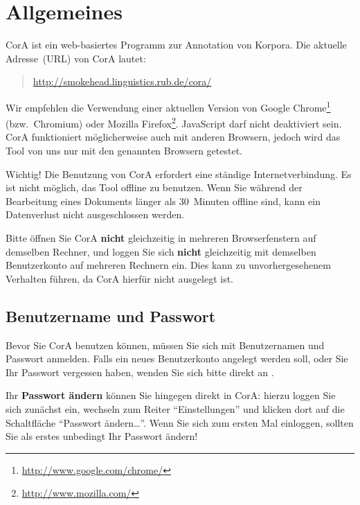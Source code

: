 \documentclass[11pt,a4paper,parskip=half]{scrartcl}
\begin{document}

\section{Allgemeines}

CorA ist ein web-basiertes Programm zur Annotation von Korpora.  Die
aktuelle Adresse~(URL) von CorA lautet:

\begin{quote}
  \url{http://smokehead.linguistics.rub.de/cora/}
\end{quote}

Wir empfehlen die Verwendung einer aktuellen Version von Google
Chrome\footnote{\url{http://www.google.com/chrome/}} (bzw.\ Chromium)
oder Mozilla Firefox\footnote{\url{http://www.mozilla.com/}}.
JavaScript darf nicht deaktiviert sein.  CorA funktioniert
möglicherweise auch mit anderen Browsern, jedoch wird das Tool von uns
nur mit den genannten Browsern getestet.

\begin{alertbox}{Wichtig!}
  Die Benutzung von CorA erfordert eine ständige Internetverbindung.
  Es ist nicht möglich, das Tool offline zu benutzen.  Wenn Sie
  während der Bearbeitung eines Dokuments länger als 30~Minuten
  offline sind, kann ein Datenverlust nicht ausgeschlossen werden.
\end{alertbox}

Bitte öffnen Sie CorA \textbf{nicht} gleichzeitig in mehreren
Browserfenstern auf demselben Rechner, und loggen Sie sich
\textbf{nicht} gleichzeitig mit demselben Benutzerkonto auf mehreren
Rechnern ein.  Dies kann zu unvorhergesehenem Verhalten führen, da
CorA hierfür nicht ausgelegt ist.

\subsection{Benutzername und Passwort}

Bevor Sie CorA benutzen können, müssen Sie sich mit Benutzernamen und
Passwort anmelden.  Falls ein neues Benutzerkonto angelegt werden
soll, oder Sie Ihr Passwort vergessen haben, wenden Sie sich bitte
direkt an \mmb{}.

Ihr \textbf{Passwort ändern} können Sie hingegen direkt in CorA:
hierzu loggen Sie sich zunächst ein, wechseln zum Reiter
"`Einstellungen"' und klicken dort auf die Schaltfläche "`Passwort
ändern\ldots"'.  Wenn Sie sich zum ersten Mal einloggen, sollten Sie
als erstes unbedingt Ihr Passwort ändern!
\end{document}
